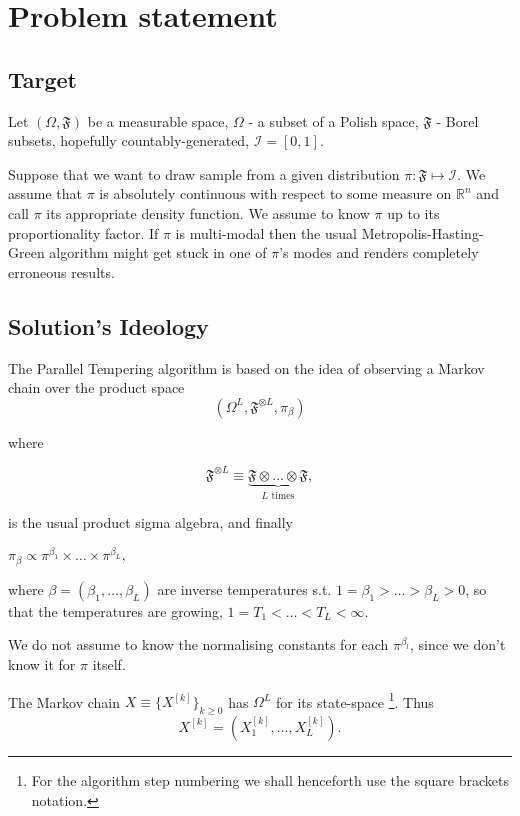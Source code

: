 \section*{Problem statement}

\subsection*{Target}
Let $(\Omega, \mathfrak{F})$ be a measurable space, $\Omega$ - a subset of a Polish space, $\mathfrak{F}$ - Borel subsets, hopefully countably-generated, $\mathcal{I} = [0,1]$.

Suppose that we want to draw sample from a given distribution $ \pi: \mathfrak{F} \mapsto \mathcal{I}$. We assume that $\pi$ is absolutely continuous with respect to some measure on $\mathbb{R}^n$ and call $\pi$ its appropriate density function. We assume to know $\pi$ up to its proportionality factor. If $\pi$ is multi-modal then the usual Metropolis-Hasting-Green algorithm might get stuck in one of $\pi$'s modes and renders completely erroneous results.


\subsection*{Solution's Ideology} 
The Parallel Tempering algorithm is based on the idea of observing a Markov chain over the product space $$(\Omega^L, \mathfrak{F}^{\otimes L}, \pi_\beta)$$

where 

	$$\mathfrak{F}^{\otimes L} \equiv \underbrace{\mathfrak{F} \otimes \dots \otimes \mathfrak{F}}_{\text{$L$ times}},$$

is the usual product sigma algebra, and finally 

\begin{assumptions}
	\item $\pi_\beta \propto \pi^{\beta_1} \times \dots \times \pi^{\beta_L},$\label{product form}
\end{assumptions}	

where $\beta = (\beta_1 , \dots , \beta_L)$ are inverse temperatures s.t. $1 = \beta_1 > \dots > \beta_L > 0$, so that the temperatures are growing, $1 = T_1 < \dots < T_L < \infty$.

We do not assume to know the normalising constants for each $\pi^{\beta_l}$, since we don't know it for $\pi$ itself.

The Markov chain $X \equiv \{ X^{[k]}\}_{k \geq 0}$ has $\Omega^L$ for its state-space \footnote{For the algorithm step numbering we shall henceforth use the square brackets notation.}. Thus $$X^{[k]} = (X_1^{[k]}, \dots, X_L^{[k]}).$$

